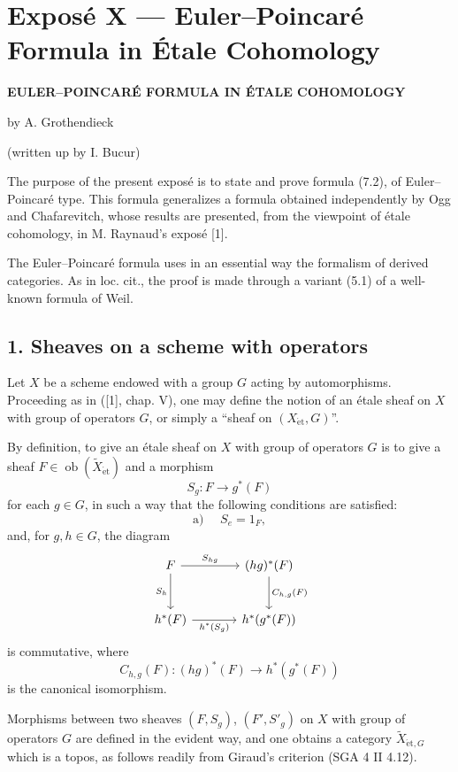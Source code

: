 \documentclass[11pt]{article}
\providecommand{\et}{\mathrm{\acute{e}t}}
\providecommand{\Ob}{\operatorname{ob}}
\providecommand{\Ob}{\operatorname{ob}}
\providecommand{\Ob}{\operatorname{Ob}}
\begin{document}
\section*{Exposé X --- Euler--Poincaré Formula in Étale Cohomology}

\begin{center}
\textbf{EULER--POINCARÉ FORMULA IN ÉTALE COHOMOLOGY}

by A. Grothendieck

(written up by I. Bucur)
\end{center}

The purpose of the present exposé is to state and prove formula (7.2), of Euler--Poincaré type. This formula generalizes a formula obtained independently by Ogg and Chafarevitch, whose results are presented, from the viewpoint of étale cohomology, in M. Raynaud's exposé [1].

The Euler--Poincaré formula uses in an essential way the formalism of derived categories. As in loc. cit., the proof is made through a variant (5.1) of a well-known formula of Weil.

\subsection*{1. Sheaves on a scheme with operators}

Let $X$ be a scheme endowed with a group $G$ acting by automorphisms. Proceeding as in ([1], chap. V), one may define the notion of an étale sheaf on $X$ with group of operators $G$, or simply a “sheaf on $(X_{\et},G)$”.

By definition, to give an étale sheaf on $X$ with group of operators $G$ is to give a sheaf $F\in \Ob(\widetilde X_{\et})$ and a morphism
\[
S_g:F\longrightarrow g^*(F)
\]
for each $g\in G$, in such a way that the following conditions are satisfied:
\[
\text{a) }\quad S_e=1_F,
\]
and, for $g,h\in G$, the diagram
\[
\begin{tikzcd}[column sep=large,row sep=large]
F \arrow[r,"S_{hg}"] \arrow[d,"S_h"'] & (hg)^*(F) \arrow[d,"C_{h,g}(F)"]\\
h^*(F) \arrow[r,"h^*(S_g)"'] & h^*(g^*(F))
\end{tikzcd}
\]
is commutative, where
\[
C_{h,g}(F):(hg)^*(F)\longrightarrow h^*(g^*(F))
\]
is the canonical isomorphism.

Morphisms between two sheaves $(F,S_g)$, $(F',S'_g)$ on $X$ with group of operators $G$ are defined in the evident way, and one obtains a category $\widetilde X_{\et,G}$ which is a topos, as follows readily from Giraud's criterion (SGA 4 II 4.12).
\end{document}
